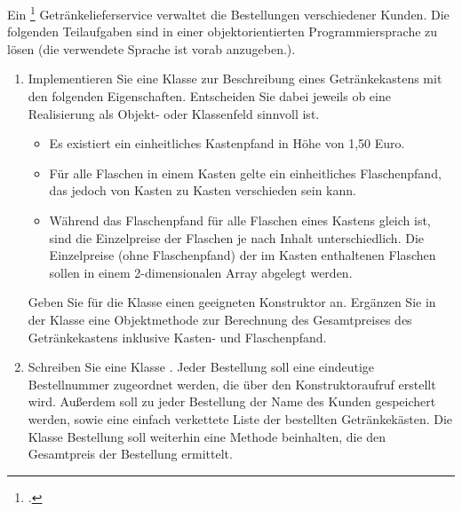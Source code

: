 \documentclass{bschlangaul-aufgabe}
\begin{document}

Ein
\footcite{examen:66116:2012:09} Getränkelieferservice verwaltet die Bestellungen verschiedener
Kunden. Die folgenden Teilaufgaben sind in einer objektorientierten
Programmiersprache zu lösen (die verwendete Sprache ist vorab
anzugeben.).

\begin{enumerate}


\item Implementieren Sie eine Klasse  zur
Beschreibung eines Getränkekastens mit den folgenden Eigenschaften.
Entscheiden Sie dabei jeweils ob eine Realisierung als Objekt- oder
Klassenfeld sinnvoll ist.

\begin{itemize}
\item Es existiert ein einheitliches Kastenpfand in Höhe von 1,50 Euro.

\item Für alle Flaschen in einem Kasten gelte ein einheitliches
Flaschenpfand, das jedoch von Kasten zu Kasten verschieden sein kann.

\item Während das Flaschenpfand für alle Flaschen eines Kastens gleich
ist, sind die Einzelpreise der Flaschen je nach Inhalt unterschiedlich.
Die Einzelpreise (ohne Flaschenpfand) der im Kasten enthaltenen Flaschen
sollen in einem 2-dimensionalen Array abgelegt werden.
\end{itemize}

Geben Sie für die Klasse  einen geeigneten
Konstruktor an. Ergänzen Sie in der Klasse  eine
Objektmethode zur Berechnung des Gesamtpreises des Getränkekastens
inklusive Kasten- und Flaschenpfand.


\item Schreiben Sie eine Klasse . Jeder
Bestellung soll eine eindeutige Bestellnummer zugeordnet werden, die
über den Konstruktoraufruf erstellt wird. Außerdem soll zu jeder
Bestellung der Name des Kunden gespeichert werden, sowie eine einfach
verkettete Liste der bestellten Getränkekästen. Die Klasse Bestellung
soll weiterhin eine Methode beinhalten, die den Gesamtpreis der
Bestellung ermittelt.


\end{enumerate}
\end{document}
